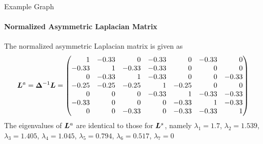 \begin{frame}{Example Graph}
\framesubtitle{Normalized Asymmetric Laplacian Matrix}
\begin{figure}
    \centerline{
	}
		\vspace{-0.2in}
 \end{figure}
\small
    The normalized asymmetric Laplacian matrix is given as
    \begin{align*}
        \bL^a = \bDelta^{-1}\bL =
        \amatr{r}{
         1   & -0.33&  0   & -0.33&  0   & -0.33&  0\\
        -0.33&  1   & -0.33& -0.33&  0   &  0   &  0\\
         0   & -0.33&  1   & -0.33&  0   &  0   & -0.33\\
        -0.25& -0.25& -0.25&  1   & -0.25&  0   &  0\\
         0   &  0   &  0   & -0.33&  1   & -0.33& -0.33\\
        -0.33&  0   &  0   &  0   & -0.33&  1   & -0.33\\
         0   &  0   & -0.33&  0   & -0.33& -0.33&  1}
    \end{align*}
    The eigenvalues of ${\boldsymbol L}^a$ are identical to those for ${\boldsymbol L}^s$,
    namely
    $\lambda_1 = 1.7$,
    $\lambda_2 =1.539$,
    $\lambda_3 = 1.405$,
    $\lambda_4 =1.045$,
    $\lambda_5 =0.794$,
    $\lambda_6 =0.517$,
    $\lambda_7 = 0 $
  \end{frame}

\ifdefined\wox \begin{frame} \titlepage \end{frame} \fi

